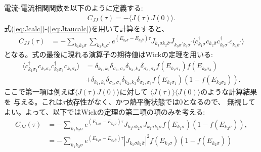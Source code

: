 \documentclass[10pt,a4j]{jarticle}
\begin{document}
電流-電流相関関数を以下のように定義する:
\begin{align}
C_{JJ}(\tau) = - \langle J(\tau) J(0) \rangle.
\end{align}
式(\ref{eq:Jcalc})-(\ref{eq:Jtaucalc})を用いて計算をすると、
\begin{align}
C_{JJ}(\tau) &= - \sum_{k_1 k_2 \sigma} \sum_{k_3 k_4 \sigma^\prime}
e^{(E_{k_1 \sigma} - E_{k_2 \bar{\sigma}})\tau} J_{k_1 \sigma k_2 \bar{\sigma}} 
J_{k_3 \sigma^\prime k_4 \bar{\sigma}^\prime} 
\langle c_{k_1\sigma}^\dagger c_{k_2 \bar{\sigma}} c_{k_3\sigma^\prime}^\dagger c_{k_4 \bar{\sigma}^\prime} \rangle
\end{align}
となる。式の最後に現れる演算子の期待値はWickの定理を用いる: 
\begin{align}
\langle c_{k_1\sigma_1}^\dagger c_{k_2\sigma_2} c^\dagger_{k_3\sigma_3} c_{k_4\sigma_4} \rangle
& = \delta_{k_1,k_2} \delta_{\sigma_1,\sigma_2} \delta_{k_3,k_4} \delta_{\sigma_3,\sigma_4} 
f(E_{k_1\sigma_1}) f(E_{k_3\sigma_3}) \nonumber \\
& + \delta_{k_1,k_4} \delta_{\sigma_1,\sigma_4} \delta_{k_2,k_3} \delta_{\sigma_2,\sigma_3} 
f(E_{k_1\sigma_1}) (1-f(E_{k_2\sigma_2})).
\end{align}
ここで第一項は例えば$\langle J(\tau) J(0) \rangle$に対して
$\langle J(\tau)\rangle \langle J(0)\rangle$のような計算結果を
与える。これは$\tau$依存性がなく、かつ熱平衡状態では0となるので、
無視してよい。よって、以下ではWickの定理の第二項の項のみを考える:
\begin{align}
C_{JJ}(\tau) & = - \sum_{k_1 k_2 \sigma} 
e^{(E_{k_1 \sigma} - E_{k_2 \bar{\sigma}})\tau} J_{k_1 \sigma k_2 \bar{\sigma}} 
J_{k_2 \bar{\sigma} k_1 \sigma} f(E_{k_1 \sigma}) (1-f(E_{k_2 \sigma})), \nonumber \\
& = - \sum_{k_1 k_2 \sigma} 
e^{(E_{k_1 \sigma} - E_{k_2 \bar{\sigma}})\tau} |J_{k_1 \sigma k_2 \bar{\sigma}} |^2 f(E_{k_1 \sigma}) (1-f(E_{k_2 \sigma}))
\end{align}
\end{document}
